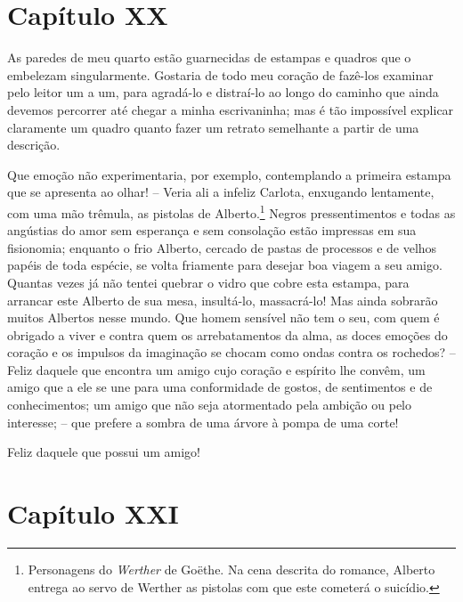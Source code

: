 \section*{Capítulo XX}

 As paredes de meu quarto estão guarnecidas de estampas e quadros que o
embelezam singularmente. Gostaria de todo meu coração de fazê-los
examinar pelo leitor um a um, para agradá-lo e distraí-lo ao longo do
caminho que ainda devemos percorrer até chegar a minha escrivaninha;
mas é tão impossível explicar claramente um quadro quanto fazer um
retrato semelhante a partir de uma descrição.

 Que emoção não experimentaria, por exemplo, contemplando a primeira
estampa que se apresenta ao olhar! -- Veria ali a infeliz Carlota,
enxugando lentamente, com uma mão trêmula, as pistolas de
Alberto.\footnote{ Personagens do \textit{Werther} de Goëthe. Na cena
descrita do romance, Alberto entrega ao servo de Werther as pistolas
com que este cometerá o suicídio.} Negros pressentimentos e todas
as angústias do amor sem esperança e sem consolação estão impressas em
sua fisionomia; enquanto o frio Alberto, cercado de pastas de processos
e de velhos papéis de toda espécie, se volta friamente para desejar boa
viagem a seu amigo. Quantas vezes já não tentei quebrar o vidro que
cobre esta estampa, para arrancar este Alberto de sua mesa, insultá-lo,
massacrá-lo! Mas ainda sobrarão muitos Albertos nesse mundo. Que homem
sensível não tem o seu, com quem é obrigado a viver e contra quem os
arrebatamentos da alma, as doces emoções do coração e os impulsos da
imaginação se chocam como ondas contra os rochedos? -- Feliz daquele
que encontra um amigo cujo coração e espírito lhe convêm, um amigo que
a ele se une para uma conformidade de gostos, de sentimentos e de
conhecimentos; um amigo que não seja atormentado pela ambição ou pelo
interesse; -- que prefere a sombra de uma árvore à pompa de uma corte!

 Feliz daquele que possui um amigo!

\section*{Capítulo XXI}

